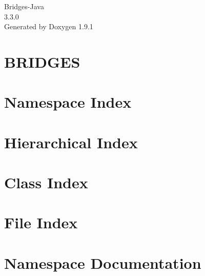 \let\mypdfximage\pdfximage\def\pdfximage{\immediate\mypdfximage}\documentclass[twoside]{book}
\newcommand{\+}{\discretionary{\mbox{\scriptsize$\hookleftarrow$}}{}{}}
\newcommand{\clearemptydoublepage}{%
  \newpage{\pagestyle{empty}\cleardoublepage}%
}
\begin{document}
\raggedbottom

\hypersetup{pageanchor=false,
             bookmarksnumbered=true,
             pdfencoding=unicode
            }
\begin{titlepage}
\vspace*{7cm}
\begin{center}%
{\Large Bridges-\/\+Java \\[1ex]\large 3.\+3.\+0 }\\
\vspace*{1cm}
{\large Generated by Doxygen 1.9.1}\\
\end{center}
\end{titlepage}
\clearemptydoublepage
{}
\tableofcontents
\clearemptydoublepage
{}
\hypersetup{pageanchor=true}

\chapter{BRIDGES}
\label{index}\hypertarget{index}{}
\chapter{Namespace Index}

\chapter{Hierarchical Index}

\chapter{Class Index}

\chapter{File Index}

\chapter{Namespace Documentation}






\end{document}
